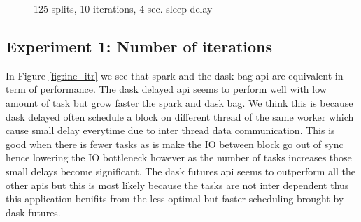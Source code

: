 \documentclass[11pt,a4paper]{article}
\begin{document}
\begin{figure}[htp]
    \centering
    
    \caption{125 splits, 10 iterations, 4 sec. sleep delay}
    \label{fig:inc_node}
\end{figure}



\subsection{Experiment 1: Number of iterations}
In Figure \ref{fig:inc_itr} we see that spark and the dask bag api are equivalent in
term of performance. The dask delayed api seems to perform well with low amount of
task but grow faster the spark and dask bag. We think this is because dask delayed
often schedule a block on different thread of the same worker which cause small delay
everytime due to inter thread data communication. This is good when there is fewer
tasks as is make the IO between block go out of sync hence lowering the IO bottleneck
however as the number of tasks increases those small delays become significant. The
dask futures api seems to outperform all the other apis but this is most likely
because the tasks are not inter dependent thus this application benifits from the
less optimal but faster scheduling brought by dask futures.
\end{document}
